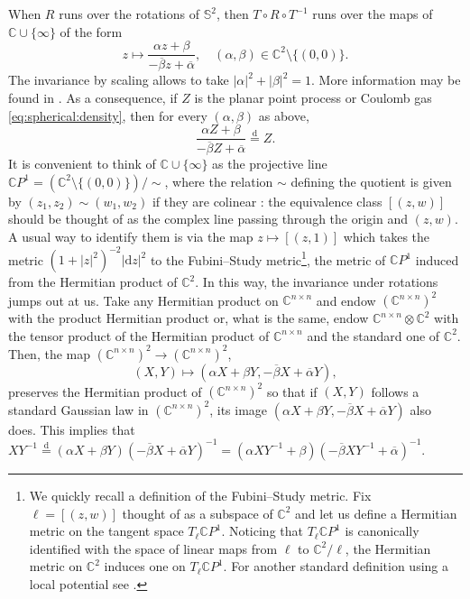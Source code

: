 \documentclass[10pt,reqno]{amsart}
\newcommand{\dd}{\mathrm{d}}
\newcommand{\<}{\langle}
\renewcommand{\>}{\rangle}
\numberwithin{equation}{section}
\begin{document}
When $R$ runs over the rotations of $\mathbb{S}^2$, then $T\circ R\circ T^{-1}$ runs over the maps of $\mathbb{C}\cup\{\infty\}$ of the form
\begin{equation}    \label{eq:su}
z\mapsto\frac{\alpha z+\beta}{-\overline{\beta}z+\overline{\alpha}}, \quad (\alpha,\beta)\in\mathbb{C}^2\setminus \{(0,0)\}.
\end{equation}
The invariance by scaling allows to take $|\alpha|^2+|\beta|^2=1$.
More information may be found in \cite{zbMATH07645442,zbMATH03176754}. 
As a consequence, 
if $Z$ is the planar point process or Coulomb gas \eqref{eq:spherical:density}, then for every
$(\alpha,\beta)$ as above,
\begin{equation} \label{eq:equalitySU}
    \frac{\alpha Z+\beta}{-\overline{\beta}Z+\overline{\alpha}}
    \overset{\dd}{=}
    Z.
\end{equation}
It is convenient to think of
$\mathbb C \cup \{\infty\}$ as
the projective line
$\mathbb CP^1 =
(\mathbb C^2\setminus \{(0,0)\})
/\sim$, where the relation $\sim$ defining the quotient is given by $(z_1,z_2) \sim (w_1,w_2)$
if they are colinear : the equivalence class $[(z,w)]$ 
should be thought of as the 
complex line passing
through the origin and $(z,w)$. A usual way to 
identify them is via the map
$z \mapsto [(z,1)]$ which takes the 
metric $(1+|z|^2)^{-2} |\mathrm d z|^2$
to the Fubini--Study metric\footnote{We
quickly recall a definition of
the Fubini--Study metric. Fix $\ell = [(z,w)]$ thought
of as a subspace of $\mathbb C^2$ and
let us define a Hermitian metric on 
the tangent space $T_\ell \mathbb CP^1$.
Noticing that $T_\ell \mathbb CP^1$ is
canonically identified
with the space of linear maps from
$\ell$ to $\mathbb C^2/\ell$, the
Hermitian metric on $\mathbb C^2$
induces one on $T_\ell \mathbb CP^1$. For another standard definition
using a local potential see 
\cite[Example 3.1.9]{fubini}.},
the metric of
$\mathbb CP^1$ induced from the Hermitian product
of $\mathbb C^2$.
In this way, the invariance under
rotations jumps out at us.
Take any Hermitian product on 
$\mathbb C^{n \times n}$
and endow $(\mathbb C^{n \times n})^2$
with the product Hermitian product or,
what is the same, 
endow 
$\mathbb C^{n \times n} \otimes \mathbb C^2$
with the tensor product of 
the Hermitian product of $\mathbb C^{n \times n}$
and the standard one of $\mathbb C^2$.
Then, the map
$(\mathbb C^{n \times n})^2
\to (\mathbb C^{n \times n})^2$,
\[(X,Y) \mapsto (\alpha X + \beta Y, 
-\overline \beta X + \overline \alpha Y),\]
preserves the Hermitian product of
$(\mathbb C^{n \times n})^2$ so that
if $(X,Y)$ follows a standard Gaussian law
in $(\mathbb C^{n \times n})^2$, its image
$(\alpha X + \beta Y, 
-\overline \beta X + \overline \alpha Y)$ also does.
This implies that
$XY^{-1} \overset{\dd}{=}
(\alpha X + \beta Y)(-\overline \beta X + \overline \alpha Y)^{-1} = 
(\alpha XY^{-1} + \beta)(-\overline \beta X Y^{-1}
+ \overline \alpha )^{-1}$.
\end{document}
